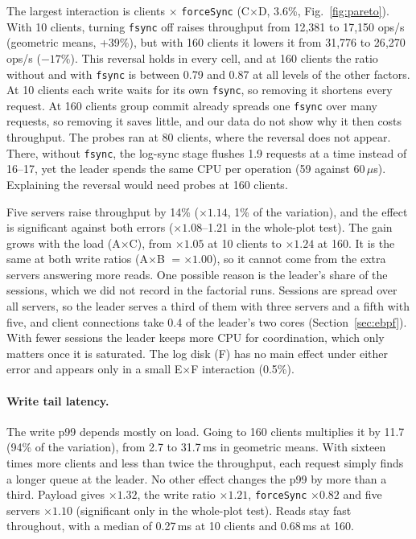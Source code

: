\documentclass{llncs}
\begin{document}
The largest interaction is clients $\times$ \texttt{forceSync} (C$\times$D, 3.6\%, Fig.~\ref{fig:pareto}). With 10 clients, turning \texttt{fsync} off raises throughput from 12{,}381 to 17{,}150 ops/s (geometric means, +39\%), but with 160 clients it lowers it from 31{,}776 to 26{,}270 ops/s ($-17\%$). This reversal holds in every cell, and at 160 clients the ratio without and with \texttt{fsync} is between 0.79 and 0.87 at all levels of the other factors. At 10 clients each write waits for its own \texttt{fsync}, so removing it shortens every request. At 160 clients group commit already spreads one \texttt{fsync} over many requests, so removing it saves little, and our data do not show why it then costs throughput. The probes ran at 80 clients, where the reversal does not appear. There, without \texttt{fsync}, the log-sync stage flushes 1.9 requests at a time instead of 16--17, yet the leader spends the same CPU per operation (59 against 60\,$\mu$s). Explaining the reversal would need probes at 160 clients.

Five servers raise throughput by 14\% ($\times1.14$, 1\% of the variation), and the effect is significant against both errors ($\times1.08$--1.21 in the whole-plot test). The gain grows with the load (A$\times$C), from $\times1.05$ at 10 clients to $\times1.24$ at 160. It is the same at both write ratios (A$\times$B $=\times1.00$), so it cannot come from the extra servers answering more reads. One possible reason is the leader's share of the sessions, which we did not record in the factorial runs. Sessions are spread over all servers, so the leader serves a third of them with three servers and a fifth with five, and client connections take 0.4 of the leader's two cores (Section~\ref{sec:ebpf}). With fewer sessions the leader keeps more CPU for coordination, which only matters once it is saturated. The log disk (F) has no main effect under either error and appears only in a small E$\times$F interaction (0.5\%).

\paragraph{Write tail latency.} The write p99 depends mostly on load. Going to 160 clients multiplies it by 11.7 (94\% of the variation), from 2.7 to 31.7\,ms in geometric means. With sixteen times more clients and less than twice the throughput, each request simply finds a longer queue at the leader. No other effect changes the p99 by more than a third. Payload gives $\times1.32$, the write ratio $\times1.21$, \texttt{forceSync} $\times0.82$ and five servers $\times1.10$ (significant only in the whole-plot test). Reads stay fast throughout, with a median of 0.27\,ms at 10 clients and 0.68\,ms at 160.
\end{document}
